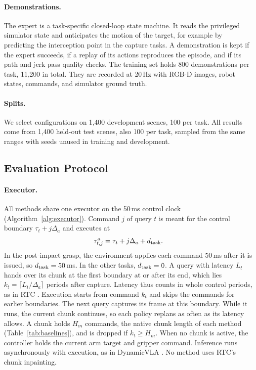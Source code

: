 \paragraph{Demonstrations.}
The expert is a task-specific closed-loop state machine. It reads the privileged
simulator state and anticipates the motion of the target, for example by predicting the
interception point in the capture tasks. A demonstration is kept if the expert succeeds,
if a replay of its actions reproduces the episode, and if its path and jerk pass quality
checks. The training set holds 800 demonstrations per task, 11{,}200 in total. They are
recorded at 20\,Hz with RGB-D images, robot states, commands, and simulator ground
truth.

\paragraph{Splits.}
We select configurations on 1{,}400 development scenes, 100 per task. All results come from 1{,}400 held-out test scenes, also 100 per task, sampled from the same ranges with seeds unused in training and development.

\subsection{Evaluation Protocol}
\label{app:sweeps}




\paragraph{Executor.}
All methods share one executor on the 50\,ms control clock
(Algorithm~\ref{alg:executor}). Command $j$ of query $t$ is meant for the control
boundary $\tau_t+j\Delta_a$ and executes at
\begin{equation}
\tau^{\mathrm a}_{t,j}=\tau_t+j\Delta_a+d_{\rm task}.
\label{eq:apptime}
\end{equation}
In the post-impact grasp, the environment applies each command 50\,ms after it is
issued, so $d_{\rm task}=50$\,ms. In the other tasks, $d_{\rm task}=0$. A query with
latency $L_t$ hands over its chunk at the first boundary at or after its end, which lies
$k_t=\lceil L_t/\Delta_a\rceil$ periods after capture. Latency thus counts in whole
control periods, as in RTC \cite{rtc}. Execution starts from command $k_t$ and skips the commands for earlier boundaries. The next query captures its frame at this boundary. While it runs, the current chunk continues, so each policy
replans as often as its latency allows. A chunk holds $H_m$ commands, the native chunk
length of each method (Table~\ref{tab:baselines}), and is dropped if $k_t\ge H_m$. When
no chunk is active, the controller holds the current arm target and gripper command.
Inference runs asynchronously with execution, as in DynamicVLA \cite{dynamicvla}. No method uses RTC's chunk inpainting.

